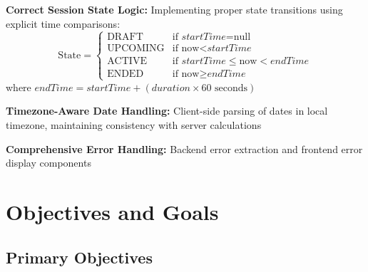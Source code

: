 \documentclass[12pt,a4paper]{report}
\newenvironment{reqbox}{%
  \begin{tcolorbox}[colback=lightgray,colframe=rulecol,
    leftrule=3pt,rightrule=0.4pt,toprule=0.4pt,bottomrule=0.4pt,
    arc=2pt,boxsep=2pt,left=4pt,right=4pt,top=3pt,bottom=3pt,breakable]
}{\end{tcolorbox}}
\begin{document}
\begin{reqbox}
  \textbf{Correct Session State Logic:} Implementing proper state transitions using explicit time comparisons:
  \begin{equation*}
    \text{State} = \begin{cases}
      \text{DRAFT} & \text{if } \textit{startTime} = \text{null} \\
      \text{UPCOMING} & \text{if } \text{now} < \textit{startTime} \\
      \text{ACTIVE} & \text{if } \textit{startTime} \leq \text{now} < \textit{endTime} \\
      \text{ENDED} & \text{if } \text{now} \geq \textit{endTime}
    \end{cases}
  \end{equation*}
  where $\textit{endTime} = \textit{startTime} + (\textit{duration} \times 60 \text{ seconds})$
  
  \textbf{Timezone-Aware Date Handling:} Client-side parsing of dates in local timezone, maintaining consistency with server calculations
  
  \textbf{Comprehensive Error Handling:} Backend error extraction and frontend error display components
\end{reqbox}

\cleardoublepage


\chapter{Objectives and Goals}

\section{Primary Objectives}
\end{document}
